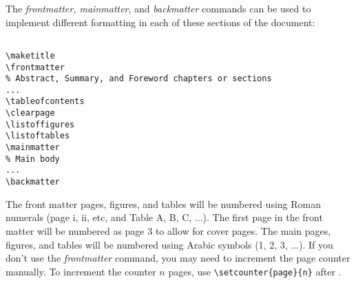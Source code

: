 The \emph{frontmatter, mainmatter}, and \emph{backmatter} commands can be used to implement different formatting in each of these sections of the document:

\begin{lstlisting}

\maketitle
\frontmatter
% Abstract, Summary, and Foreword chapters or sections
...
\tableofcontents
\clearpage
\listoffigures
\listoftables
\mainmatter
% Main body
...
\backmatter

\end{lstlisting}

The front matter pages, figures, and tables will be numbered using Roman numerals (page i, ii, etc, and Table A, B, C, ...). The first page in the front matter will be numbered as page 3 to allow for cover pages. The main pages, figures, and tables will be numbered using Arabic symbols (1, 2, 3, ...). If you don't use the \emph{frontmatter} command, you may need to increment the page counter manually. To increment the counter $n$ pages, use \verb+\setcounter{page}{n}+ after \verb++.